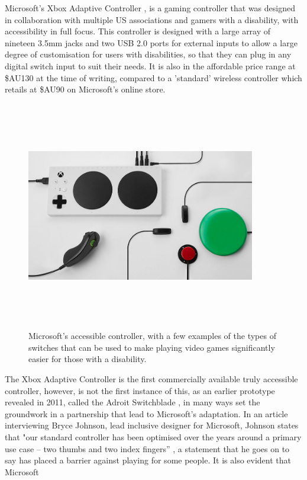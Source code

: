 Microsoft's Xbox Adaptive Controller \cite{adaptive}, is a gaming controller that was designed in collaboration with multiple US associations and gamers with a disability, with accessibility in full focus.
This controller is designed with a large array of nineteen 3.5mm jacks and two USB 2.0 ports for external inputs \cite{adaptive} to allow a large degree of customisation for users with disabilities, so that they can plug in any digital switch input to suit their needs.
It is also in the affordable price range at \$AU130 \cite{accessiblecontroller} at the time of writing, compared to a 'standard' wireless controller which retails at \$AU90 \cite{standardcontroller} on Microsoft's online store.

\begin{figure} [h]
    \centering
    \includegraphics[width=10cm,height=10cm,keepaspectratio]{Figures/accessible_controller.png}
    \caption{Microsoft's accessible controller, with a few examples of the types of switches that can be used to make playing video games significantly easier for those with a disability.}
    \label{fig:Jellybean}
\end{figure}

The Xbox Adaptive Controller is the first commercially available truly accessible controller, however, is not the first instance of this, as an earlier prototype revealed in 2011, called the Adroit Switchblade \cite{ablegamer}, in many ways set the groundwork in a partnership that lead to Microsoft's adaptation.
In an article interviewing Bryce Johnson, lead inclusive designer for Microsoft, Johnson states that "our standard controller has been optimised over the years around a primary use case – two thumbs and two index fingers” \cite{disabilitygaming}, a statement that he goes on to say has placed a barrier against playing for some people.
It is also evident that Microsoft %

